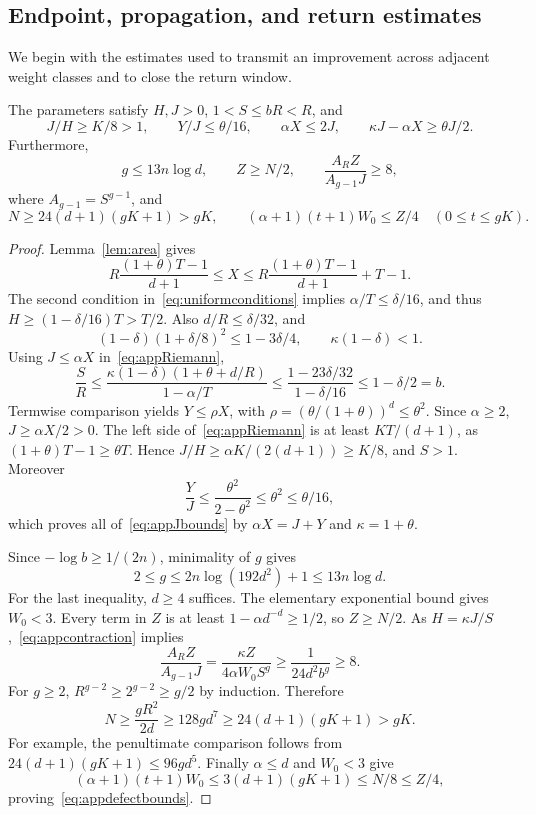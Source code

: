 \documentclass[manuscript,review,anonymous]{acmart}
\begin{document}
\subsection{Endpoint, propagation, and return estimates}
We begin with the estimates used to transmit an improvement across adjacent weight classes and to close the return window.
\begin{lemma}\label{lem:appestimates}
The parameters satisfy $H,J>0$, $1<S\le bR<R$, and
\begin{equation}\label{eq:appJbounds}
 J/H\ge K/8>1,\qquad
 Y/J\le\theta/16,\qquad \alpha X\le2J,\qquad
 \kappa J-\alpha X\ge\theta J/2.
\end{equation}
Furthermore,
\begin{equation}\label{eq:appreturnbounds}
 g\le13n\log d,\qquad Z\ge N/2,\qquad
 \frac{A_RZ}{A_{g-1}J}\ge8,
\end{equation}
where $A_{g-1}=S^{g-1}$, and
\begin{equation}\label{eq:appdefectbounds}
 N\ge24(d+1)(gK+1)>gK,\qquad
 (\alpha+1)(t+1)W_0\le Z/4\quad(0\le t\le gK).
\end{equation}
\end{lemma}
\begin{proof}
Lemma~\ref{lem:area} gives
\begin{equation}\label{eq:appRiemann}
 R\frac{(1+\theta)T-1}{d+1}
 \le X\le R\frac{(1+\theta)T-1}{d+1}+T-1.
\end{equation}
The second condition in~\eqref{eq:uniformconditions} implies $\alpha/T\le\delta/16$, and thus $H\ge(1-\delta/16)T>T/2$. Also $d/R\le\delta/32$, and
\[
 (1-\delta)(1+\delta/8)^2\le1-3\delta/4,
 \qquad\kappa(1-\delta)<1.
\]
Using $J\le\alpha X$ in~\eqref{eq:appRiemann},
\begin{equation}\label{eq:appcontraction}
 \frac SR\le
 \frac{\kappa(1-\delta)(1+\theta+d/R)}{1-\alpha/T}
 \le\frac{1-23\delta/32}{1-\delta/16}
 \le1-\delta/2=b.
\end{equation}
Termwise comparison yields $Y\le\rho X$, with $\rho=(\theta/(1+\theta))^d\le\theta^2$. Since $\alpha\ge2$, $J\ge\alpha X/2>0$. The left side of~\eqref{eq:appRiemann} is at least $KT/(d+1)$, as $(1+\theta)T-1\ge\theta T$. Hence $J/H\ge\alpha K/(2(d+1))\ge K/8$, and $S>1$. Moreover
\[
 \frac YJ\le\frac{\theta^2}{2-\theta^2}\le\theta^2\le\theta/16,
\]
which proves all of~\eqref{eq:appJbounds} by $\alpha X=J+Y$ and $\kappa=1+\theta$.

Since $-\log b\ge1/(2n)$, minimality of $g$ gives
\[
 2\le g\le2n\log(192d^2)+1\le13n\log d.
\]
For the last inequality, $d\ge4$ suffices. The elementary exponential bound gives $W_0<3$. Every term in $Z$ is at least $1-\alpha d^{-d}\ge1/2$, so $Z\ge N/2$. As $H=\kappa J/S$,~\eqref{eq:appcontraction} implies
\[
 \frac{A_RZ}{A_{g-1}J}
 =\frac{\kappa Z}{4\alpha W_0S^g}
 \ge\frac1{24d^2b^g}\ge8.
\]
For $g\ge2$, $R^{g-2}\ge2^{g-2}\ge g/2$ by induction. Therefore
\[
 N\ge\frac{gR^2}{2d}\ge128gd^7
 \ge24(d+1)(gK+1)>gK.
\]
For example, the penultimate comparison follows from
$24(d+1)(gK+1)\le96gd^5$. Finally $\alpha\le d$ and $W_0<3$ give
\[
 (\alpha+1)(t+1)W_0\le3(d+1)(gK+1)\le N/8\le Z/4,
\]
proving~\eqref{eq:appdefectbounds}.
\end{proof}
\end{document}
